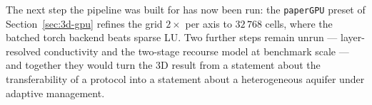 The next step the pipeline was built for has now been run: the
\texttt{paperGPU} preset of Section~\ref{sec:3d-gpu} refines the grid $2\times$
per axis to $32\,768$ cells, where the batched torch backend beats sparse LU.
Two further steps remain unrun --- layer-resolved conductivity and the two-stage
recourse model at benchmark scale --- and together they would turn the 3D result
from a statement about the transferability of a protocol into a statement about
a heterogeneous aquifer under adaptive management.

